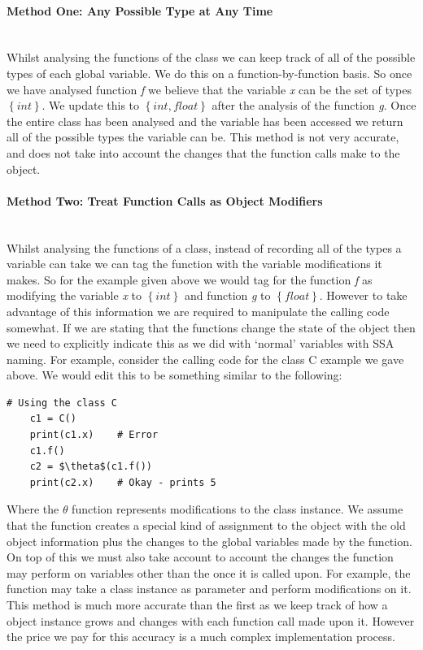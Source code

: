 \documentclass[12pt, titlepage]{article}
\begin{document}
\paragraph{Method One: Any Possible Type at Any Time}\mbox{}\\
Whilst analysing the functions of the class we can keep track of all of the possible types of each global variable. We do this on a function-by-function basis. So once we have analysed function \textit{f} we believe that the variable \textit{x} can be the set of types $\left\{ {int}\right\}$. We update this to $\left\{ {int, float}\right\}$ after the analysis of the function \textit{g}. Once the entire class has been analysed and the variable has been accessed we return all of the possible types the variable can be. This method is not very accurate, and does not take into account the changes that the function calls make to the object.

\paragraph{Method Two: Treat Function Calls as Object Modifiers}\mbox{}\\
Whilst analysing the functions of a class, instead of recording all of the types a variable can take we can tag the function with the variable modifications it makes. So for the example given above we would tag for the function \textit{f} as modifying the variable \textit{x} to $\left\{ {int}\right\}$ and function \textit{g} to $\left\{ {float}\right\}$. However to take advantage of this information we are required to manipulate the calling code somewhat. If we are stating that the functions change the state of the object then we need to explicitly indicate this as we did with `normal' variables with SSA naming. For example, consider the calling code for the class C example we gave above. We would edit this to be something similar to the following:
\begin{lstlisting}[mathescape]
    # Using the class C
    c1 = C()
    print(c1.x)    # Error
    c1.f()
    c2 = $\theta$(c1.f())
    print(c2.x)    # Okay - prints 5
\end{lstlisting}
Where the $\theta$ function represents modifications to the class instance. We assume that the function creates a special kind of assignment to the object with the old object information plus the changes to the global variables made by the function. On top of this we must also take account to account the changes the function may perform on variables other than the once it is called upon. For example, the function may take a class instance as parameter and perform modifications on it. \\
\indent This method is much more accurate than the first as we keep track of how a object instance grows and changes with each function call made upon it. However the price we pay for this accuracy is a much complex implementation process.
\end{document}
